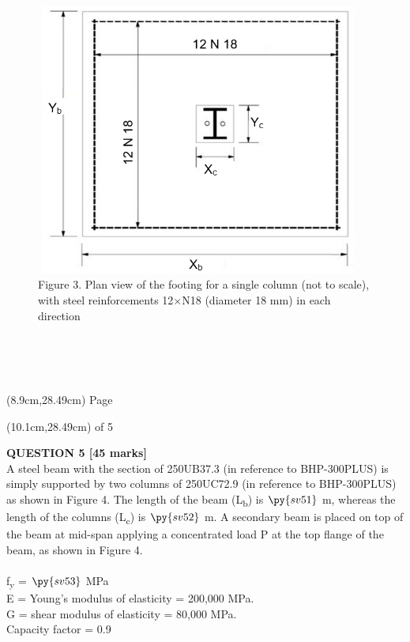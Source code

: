 \documentclass[a4paper,11pt]{article}
\begin{document}
\begin{figure}[ht]
\includegraphics[width=10.72cm, height=8.94cm]{Figure3.png}\\
\centering
Figure 3. Plan view of the footing for a single column (not to scale), with steel reinforcements 12$\times$N18 (diameter 18 mm) in each direction\\
\centering
\end{figure}
\\
\\
\\
\begin{textblock*}{5cm}(8.9cm,28.49cm)
Page
\end{textblock*}
\begin{textblock*}{5cm}(10.1cm,28.49cm)
of 5
\end{textblock*}
\newpage
\noindent
\textbf{QUESTION 5 [45 marks]}\\
A steel beam with the section of 250UB37.3 (in reference to BHP-300PLUS) is simply supported by two columns of 250UC72.9 (in reference to BHP-300PLUS) as shown in Figure 4. The length of the beam (L\textsubscript{b}) is $\py{sv51}$ m, whereas the length of the columns (L\textsubscript{c}) is $\py{sv52}$ m. A secondary beam is placed on top of the beam at mid-span applying a concentrated load P at the top flange of the beam, as shown in Figure 4.\\
\\
f\textsubscript{y} = $\py{sv53}$ MPa\\
E = Young’s modulus of elasticity = 200,000 MPa.\\
G = shear modulus of elasticity = 80,000 MPa.\\
Capacity factor \phi = 0.9\\
\end{document}

